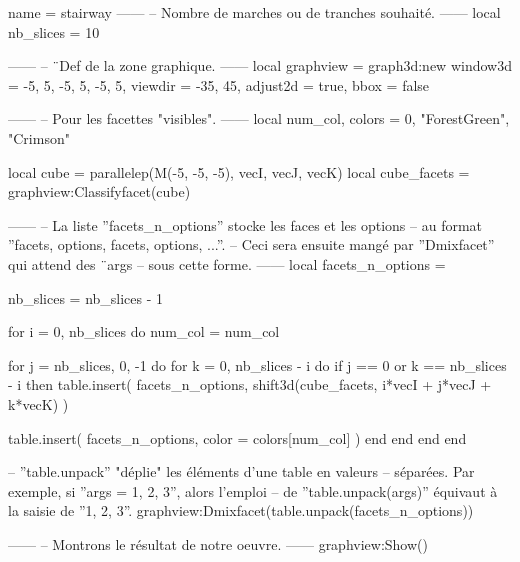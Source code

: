 \documentclass[border = 3pt]{standalone}
\begin{document}
\begin{luadraw*}{name = stairway}
------
-- Nombre de marches ou de tranches souhaité.
------
local nb_slices = 10

------
-- ¨Def de la zone graphique.
------
local graphview = graph3d:new{
  window3d = {-5, 5, -5, 5, -5, 5},
  viewdir  = {-35, 45},
  adjust2d = true,
  bbox     = false
}

------
-- Pour les facettes "visibles".
------
local num_col, colors = 0, {"ForestGreen", "Crimson"}

local cube        = parallelep(M(-5, -5, -5), vecI, vecJ, vecK)
local cube_facets = graphview:Classifyfacet(cube)

------
-- La liste ''facets_n_options'' stocke les faces et les options
-- au format ''{facets, options, facets, options, ...}''.
-- Ceci sera ensuite mangé par ''Dmixfacet'' qui attend des ¨args
-- sous cette forme.
------
local facets_n_options = {}

nb_slices = nb_slices - 1

for i = 0, nb_slices do
  num_col = num_col%

  for j = nb_slices, 0, -1 do
    for k = 0, nb_slices - i do
      if j == 0 or k == nb_slices - i then
        table.insert(
          facets_n_options,
          shift3d(cube_facets, i*vecI + j*vecJ + k*vecK)
        )

        table.insert(
          facets_n_options,
          {
            color = colors[num_col]
          }
        )
      end
    end
  end
end

-- ''table.unpack'' "déplie" les éléments d'une table en valeurs
-- séparées. Par exemple, si ''args = {1, 2, 3}'', alors l'emploi
-- de ''table.unpack(args)'' équivaut à la saisie de ''1, 2, 3''.
graphview:Dmixfacet(table.unpack(facets_n_options))

------
-- Montrons le résultat de notre oeuvre.
------
graphview:Show()
\end{luadraw*}
\end{document}
